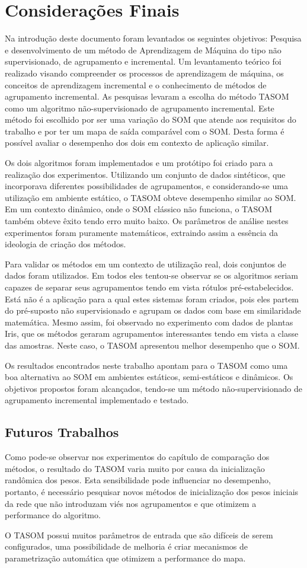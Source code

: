 \chapter{Considerações Finais}
Na introdução deste documento foram levantados os seguintes objetivos: Pesquisa e desenvolvimento de um método de Aprendizagem de Máquina do tipo não supervisionado, de agrupamento e incremental. Um levantamento teórico foi realizado visando compreender os processos de aprendizagem de máquina, os conceitos de aprendizagem incremental e o conhecimento de métodos de agrupamento incremental. As pesquisas levaram a escolha do método TASOM como um algoritmo não-supervisionado de agrupamento incremental. Este método foi escolhido por ser uma variação do SOM que atende aos requisitos do trabalho e por ter um mapa de saída comparável com o SOM. Desta forma é possível avaliar o desempenho dos dois em contexto de aplicação similar.

Os dois algoritmos foram implementados e um protótipo foi criado para a realização dos experimentos. Utilizando um conjunto de dados sintéticos, que incorporava diferentes possibilidades de agrupamentos, e considerando-se uma utilização em ambiente estático, o TASOM obteve desempenho similar ao SOM. Em um contexto dinâmico, onde o SOM clássico não funciona, o TASOM também obteve êxito tendo erro muito baixo. Os parâmetros de análise nestes experimentos foram puramente matemáticos, extraindo assim a essência da ideologia de criação dos métodos.

Para validar os métodos em um contexto de utilização real, dois conjuntos de dados foram utilizados. Em todos eles tentou-se observar se os algoritmos seriam capazes de separar seus agrupamentos tendo em vista rótulos pré-estabelecidos. Está não é a aplicação para a qual estes sistemas foram criados, pois eles partem do pré-suposto não supervisionado e agrupam os dados com base em similaridade matemática. Mesmo assim, foi observado no experimento com dados de plantas Iris, que os métodos geraram agrupamentos interessantes tendo em vista a classe das amostras. Neste caso, o TASOM apresentou melhor desempenho que o SOM. 

Os resultados encontrados neste trabalho apontam para o TASOM como uma boa alternativa ao SOM em ambientes estáticos, semi-estáticos e dinâmicos. Os objetivos propostos foram alcançados, tendo-se um método não-supervisionado de agrupamento incremental implementado e testado.

\section{Futuros Trabalhos}
Como pode-se observar nos experimentos do capítulo de comparação dos métodos, o resultado do TASOM varia muito por causa da inicialização randômica dos pesos. Esta sensibilidade pode influenciar no desempenho, portanto, é necessário pesquisar novos métodos de inicialização dos pesos iniciais da rede que não introduzam viés nos agrupamentos e que otimizem a performance do algoritmo.

O TASOM possui muitos parâmetros de entrada que são difíceis de serem configurados, uma possibilidade de melhoria é criar mecanismos de parametrização automática que otimizem a performance do mapa.    

   